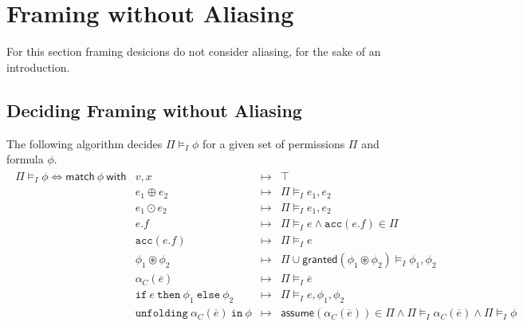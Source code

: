 \documentclass{article}
\newcommand{\tsf}{\textsf}
\newcommand{\ttt}{\texttt}
\newcommand{\assume}{\tsf{assume}}
\newcommand{\frames}{\vDash_I}
\newcommand{\mt}{\mapsto}
\newcommand{\cast}{\circledast}
\renewcommand{\vec}{\overline}
\newcommand{\cif}{\ttt{if}}
\newcommand{\cthen}{\ttt{then}}
\newcommand{\celse}{\ttt{else}}
\newcommand{\cacc}{\ttt{acc}}
\newcommand{\cunfolding}{\ttt{unfolding}}
\newcommand{\cin}{\ttt{in}}
\newcommand{\granted}{\tsf{granted}}
\begin{document}
\section{Framing without Aliasing}

For this section framing desicions do not consider aliasing, for the sake of an introduction.

\subsection{Deciding Framing without Aliasing}

\noindent
The following algorithm decides $\Pi \frames \phi$ for a given set of permissions $\Pi$ and formula $\phi$.
\begin{align*}
\begin{array}{r|lrl}
\Pi \frames \phi
\iff \tsf{match} \ \phi \ \tsf{with}
%
%
& v, x                &\mt& \top
\\
& e_1 \oplus e_2      &\mt& \Pi \frames e_1, e_2
\\
& e_1 \odot e_2       &\mt& \Pi \frames e_1, e_2
\\
& e.f                 &\mt& \Pi \frames e
                      \land \cacc(e.f) \in \Pi
\\
%
& \cacc(e.f)          &\mt& \Pi \frames e
\\
& \phi_1 \cast \phi_2 &\mt& \Pi \cup \tsf{granted}(\phi_1 \cast \phi_2) \frames \phi_1, \phi_2
\\
& \alpha_C(\vec{e})   &\mt& \Pi \frames \vec{e}
\\
& \cif \ e \ \cthen \ \phi_1 \ \celse \ \phi_2
                      &\mt& \Pi \frames e, \phi_1, \phi_2
\\
& \cunfolding \ \alpha_C(\vec{e}) \ \cin \ \phi
                      &\mt& \assume(\alpha_C(\vec{e})) \in \Pi
                      \land \Pi \frames \alpha_C(\vec{e})
                      \land \Pi \frames \phi
\end{array}
\end{align*}
\end{document}

